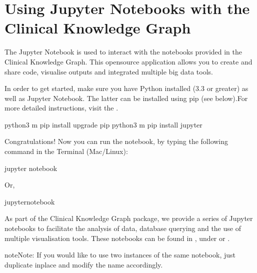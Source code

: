 \documentclass[letterpaper,10pt,english]{sphinxmanual}
\begin{document}
\section{Using Jupyter Notebooks with the Clinical Knowledge Graph}
\label{\detokenize{advanced_features/ckg-notebooks:using-jupyter-notebooks-with-the-clinical-knowledge-graph}}\label{\detokenize{advanced_features/ckg-notebooks::doc}}
The Jupyter Notebook is used to interact with the notebooks provided in the Clinical Knowledge Graph.
This open\sphinxhyphen{}source application allows you to create and share code, visualise outputs and integrated multiple big data tools.

In order to get started, make sure you have Python installed (3.3 or greater) as well as Jupyter Notebook. The latter can be installed using pip (see below).For more detailed instructions, visit the .

\begin{sphinxVerbatim}[commandchars=\\\{\}]
\PYGZdl{} python3 \PYGZhy{}m pip install \PYGZhy{}\PYGZhy{}upgrade pip
\PYGZdl{} python3 \PYGZhy{}m pip install jupyter
\end{sphinxVerbatim}

Congratulations! Now you can run the notebook, by typing the following command in the Terminal (Mac/Linux):

\begin{sphinxVerbatim}[commandchars=\\\{\}]
\PYGZdl{} jupyter notebook
\end{sphinxVerbatim}

Or,

\begin{sphinxVerbatim}[commandchars=\\\{\}]
\PYGZdl{} jupyter\PYGZhy{}notebook
\end{sphinxVerbatim}

As part of the Clinical Knowledge Graph package, we provide a series of Jupyter notebooks to facilitate the analysis of data, database querying and the use of multiple visualisation tools. These notebooks can be found in , under  or .

\begin{sphinxadmonition}{note}{Note:}
If you would like to use two instances of the same notebook, just duplicate in\sphinxhyphen{}place and modify the name accordingly.
\end{sphinxadmonition}
\end{document}
